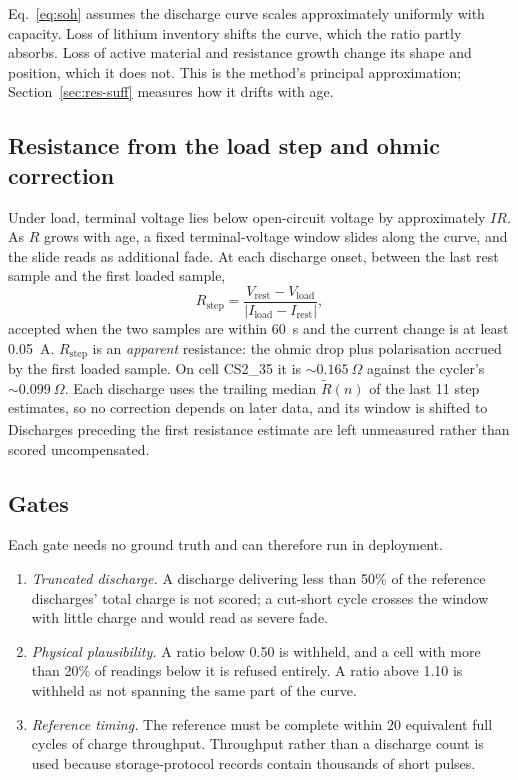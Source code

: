 \documentclass[preprint,12pt,authoryear]{elsarticle}
\begin{document}
Eq.~\eqref{eq:soh} assumes the discharge curve scales approximately uniformly
with capacity. Loss of lithium inventory shifts the curve, which the ratio
partly absorbs. Loss of active material and resistance growth change its shape
and position, which it does not. This is the method's principal approximation;
Section~\ref{sec:res-suff} measures how it drifts with age.

\subsection{Resistance from the load step and ohmic correction}
Under load, terminal voltage lies below open-circuit voltage by approximately
$IR$. As $R$ grows with age, a fixed terminal-voltage window slides along the
curve, and the slide reads as additional fade. At each discharge onset,
between the last rest sample and the first loaded sample,
\begin{equation}
R_\mathrm{step} = \frac{V_\mathrm{rest} - V_\mathrm{load}}{|I_\mathrm{load} - I_\mathrm{rest}|},
\label{eq:rstep}
\end{equation}
accepted when the two samples are within 60~s and the current change is at
least 0.05~A. $R_\mathrm{step}$ is an \emph{apparent} resistance: the ohmic
drop plus polarisation accrued by the first loaded sample. On cell CS2\_35 it
is ${\sim}0.165~\Omega$ against the cycler's ${\sim}0.099~\Omega$. Each
discharge uses the trailing median $\tilde R(n)$ of the last 11 step estimates,
so no correction depends on later data, and its window is shifted to
\begin{equation}
[V_\mathrm{low} - |I_n|\tilde R(n),\; V_\mathrm{high} - |I_n|\tilde R(n)] .
\label{eq:shift}
\end{equation}
Discharges preceding the first resistance estimate are left unmeasured rather
than scored uncompensated.

\subsection{Gates}
Each gate needs no ground truth and can therefore run in deployment.
\begin{enumerate}
\item \emph{Truncated discharge.} A discharge delivering less than 50\% of the
reference discharges' total charge is not scored; a cut-short cycle crosses the
window with little charge and would read as severe fade.
\item \emph{Physical plausibility.} A ratio below 0.50 is withheld, and a cell
with more than 20\% of readings below it is refused entirely. A ratio above
1.10 is withheld as not spanning the same part of the curve.
\item \emph{Reference timing.} The reference must be complete within 20
equivalent full cycles of charge throughput. Throughput rather than a
discharge count is used because storage-protocol records contain thousands of
short pulses.
\end{enumerate}
\end{document}
